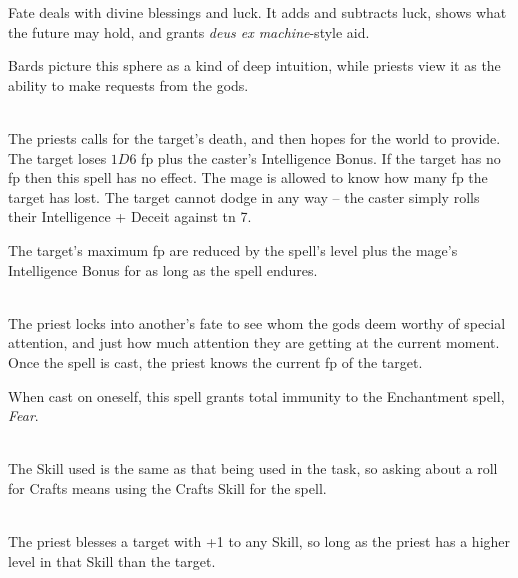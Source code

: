 \begin{multicols}{2}

\noindent
Fate deals with divine blessings and luck.
It adds and subtracts luck, shows what the future may hold, and grants \textit{deus ex machine}-style aid.

Bards picture this sphere as a kind of deep intuition, while priests view it as the ability to make requests from the gods.

\spelllevel

\\
The priests calls for the target's death, and then hopes for the world to provide.
The target loses $1D6$ \gls{fp} plus the caster's Intelligence Bonus.
If the target has no \gls{fp} then this spell has no effect.
The mage is allowed to know how many \gls{fp} the target has lost.
The target cannot dodge in any way -- the caster simply rolls their Intelligence + Deceit against \gls{tn} 7.

The target's maximum \gls{fp} are reduced by the spell's level plus the mage's Intelligence Bonus for as long as the spell endures.

\\
The priest locks into another's fate to see whom the gods deem worthy of special attention, and just how much attention they are getting at the current moment.
Once the spell is cast, the priest knows the current \gls{fp} of the target.

When cast on oneself, this spell grants total immunity to the Enchantment spell, \textit{Fear}.

\\
\iftoggle{verbose}{%
	Players often don't know the \gls{tn} for an action before they try it, but with this spell, the priest may demand to know the \gls{tn}.
	This can be used to figure out how difficult it would be to strike an enemy, or how challenging it would be to spread a rumour around town.
}{%
	The player can ask the \gls{gm} the \gls{tn} for any currently possible action.
}
The Skill used is the same as that being used in the task, so asking about a roll for Crafts means using the Crafts Skill for the spell.

\\
The priest blesses a target with +1 to any Skill, so long as the priest has a higher level in that Skill than the target.


\end{multicols}
